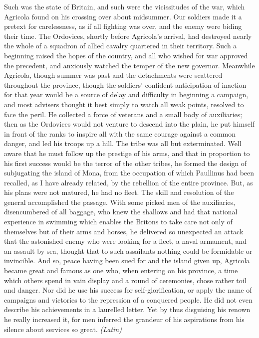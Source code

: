 
Such was the state of Britain, and such were the vicissitudes of the war, which Agricola found on his crossing over about midsummer. Our soldiers made it a pretext for carelessness, as if all fighting was over, and the enemy were biding their time. The Ordovices, shortly before Agricola's arrival, had destroyed nearly the whole of a squadron of allied cavalry quartered in their territory. Such a beginning raised the hopes of the country, and all who wished for war approved the precedent, and anxiously watched the temper of the new governor. Meanwhile Agricola, though summer was past and the detachments were scattered throughout the province, though the soldiers' confident anticipation of inaction for that year would be a source of delay and difficulty in beginning a campaign, and most advisers thought it best simply to watch all weak points, resolved to face the peril. He collected a force of veterans and a small body of auxiliaries; then as the Ordovices would not venture to descend into the plain, he put himself in front of the ranks to inspire all with the same courage against a common danger, and led his troops up a hill. The tribe was all but exterminated. Well aware that he must follow up the prestige of his arms, and that in proportion to his first success would be the terror of the other tribes, he formed the design of subjugating the island of Mona, from the occupation of which Paullinus had been recalled, as I have already related, by the rebellion of the entire province. But, as his plans were not matured, he had no fleet. The skill and resolution of the general accomplished the passage. With some picked men of the auxiliaries, disencumbered of all baggage, who knew the shallows and had that national experience in swimming which enables the Britons to take care not only of themselves but of their arms and horses, he delivered so unexpected an attack that the astonished enemy who were looking for a fleet, a naval armament, and an assault by sea, thought that to such assailants nothing could be formidable or invincible. And so, peace having been sued for and the island given up, Agricola became great and famous as one who, when entering on his province, a time which others spend in vain display and a round of ceremonies, chose rather toil and danger. Nor did he use his success for self-glorification, or apply the name of campaigns and victories to the repression of a conquered people. He did not even describe his achievements in a laurelled letter. Yet by thus disguising his renown he really increased it, for men inferred the grandeur of his aspirations from his silence about services so great. \emph{(Latin)}

